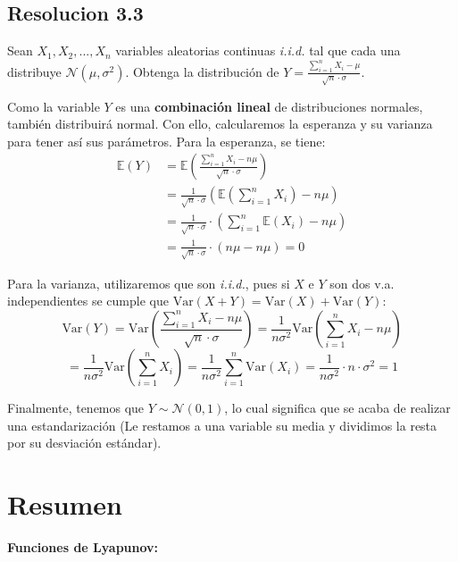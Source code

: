 \documentclass[
  11pt,
  letterpaper,
   addpoints,
   answers
  ]{exam}
\begin{document}
\begin{questions}
\begin{solution}
\subsection*{Resolucion 3.3}
Sean \( X_1, X_2, ..., X_n \) variables aleatorias continuas \textit{i.i.d.} tal que cada una distribuye \( \mathcal{N}(\mu, \sigma^2) \). Obtenga la distribución de 
    $
    Y = \frac{\sum_{i=1}^{n} X_i - \mu}{\sqrt{n} \cdot \sigma}.
    $

Como la variable \( Y \) es una \textbf{combinación lineal} de distribuciones normales, también distribuirá normal. Con ello, calcularemos la esperanza y su varianza para tener así sus parámetros. Para la esperanza, se tiene:
\begin{align*}
\mathbb{E}(Y) &= \mathbb{E}\left( \frac{\sum_{i=1}^{n} X_i - n\mu}{\sqrt{n} \cdot \sigma} \right) \\
&= \frac{1}{\sqrt{n} \cdot \sigma} \left( \mathbb{E}\left( \sum_{i=1}^{n} X_i \right) - n\mu \right) \\
&= \frac{1}{\sqrt{n} \cdot \sigma} \cdot \left( \sum_{i=1}^{n} \mathbb{E}(X_i) - n\mu \right) \\
&= \frac{1}{\sqrt{n} \cdot \sigma} \cdot (n\mu - n\mu) = 0
\end{align*}

Para la varianza, utilizaremos que son \textit{i.i.d.}, pues si \( X \) e \( Y \) son dos v.a. independientes se cumple que \( \text{Var}(X + Y) = \text{Var}(X) + \text{Var}(Y) \):
\[
\text{Var}(Y) = \text{Var}\left( \frac{\sum_{i=1}^{n} X_i - n\mu}{\sqrt{n} \cdot \sigma} \right) = \frac{1}{n\sigma^2} \text{Var}\left( \sum_{i=1}^{n} X_i - n\mu \right)
\]
\[
= \frac{1}{n\sigma^2} \text{Var}\left( \sum_{i=1}^{n} X_i \right) = \frac{1}{n\sigma^2} \sum_{i=1}^{n} \text{Var}(X_i) = \frac{1}{n\sigma^2} \cdot n \cdot \sigma^2 = 1
\]

Finalmente, tenemos que \( Y \sim \mathcal{N}(0, 1) \), lo cual significa que se acaba de realizar una estandarización (Le restamos a una variable su media y dividimos la resta por su desviación estándar).
\end{solution}
\end{questions}
\newpage
\section{Resumen}

\textbf{Funciones de Lyapunov:}
\end{document}
